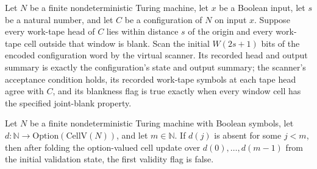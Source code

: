 \begin{theorem}
\label{Complexity.Codec.vScan_cfgWord}
\leanok
{}
Let $N$ be a finite nondeterministic Turing machine, let $x$ be a Boolean input, let $s$
be a natural number, and let $C$ be a configuration of $N$ on input $x$. Suppose every
work-tape head of $C$ lies within distance $s$ of the origin and every work-tape cell
outside that window is blank. Scan the initial $W(2s+1)$ bits of the encoded
configuration word by the virtual scanner. Its recorded head and output summary is
exactly the configuration's state and output summary; the scanner's acceptance condition
holds, its recorded work-tape symbols at each tape head agree with $C$, and its
blankness flag is true exactly when every window cell has the specified joint-blank
property.
\end{theorem}

\begin{lemma}
\label{Complexity.Codec.foldl_vStepO_none}
\leanok
{}
Let $N$ be a finite nondeterministic Turing machine with Boolean symbols, let
$d:\mathbb{N}\to\mathrm{Option}({\mathrm{CellV}(N)})$, and let $m\in\mathbb{N}$. If
$d(j)$ is absent for some $j<m$, then after folding the option-valued cell update over
$d(0),\ldots,d(m-1)$ from the initial validation state, the first validity flag is
false.
\end{lemma}

